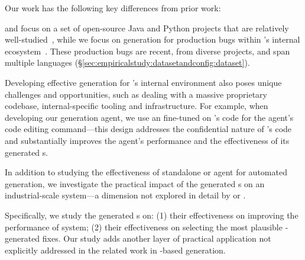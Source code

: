 Our work has the following key differences from prior work:

\libro and \swtbench focus on a set of open-source Java and Python projects that are relatively well-studied~\cite{yang2024swe,Ernst2014Defects4J}, while we focus on \brt generation for production bugs within \google's internal ecosystem~\cite{rondon2025passerine}.
These production bugs are recent, from diverse projects, and span multiple languages (\S\ref{sec:empiricalstudy:datasetandconfig:dataset}).

Developing effective \brt generation for \google's internal environment also poses unique challenges and opportunities, such as dealing with a massive proprietary codebase, internal-specific tooling and infrastructure.
For example, when developing our \brt generation agent, we use an \llm fine-tuned on \google's code for the agent's code editing command---this design addresses the confidential nature of \google's code and substantially improves the agent's performance and the effectiveness of its generated \brt{}s.


In addition to studying the effectiveness of standalone \llm or \llm agent for automated \brt generation, we investigate the practical impact of the generated \brt{}s on an industrial-scale \autopr system---a dimension not explored in detail by \libro or \swtbench.

Specifically, we study the generated \brt{}s on: (1) their effectiveness on improving the performance of \autopr system; (2) their effectiveness on selecting the most plausible \autopr-generated fixes.
Our study adds another layer of practical application not explicitly addressed in the related work in \llm-based \brt generation.




    






















